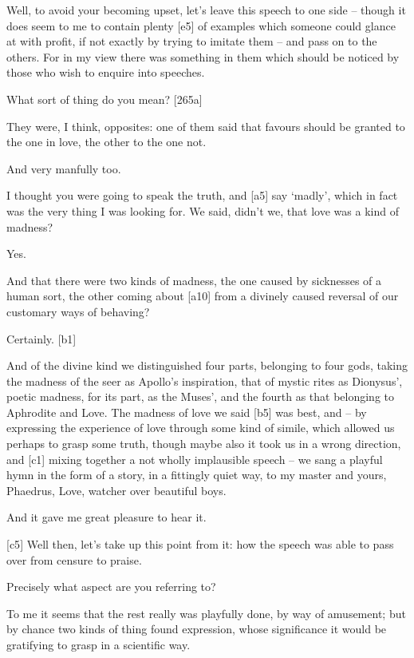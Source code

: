  Well, to avoid your becoming upset, let's leave this speech to
one side -- though it does seem to me to contain plenty {[}e5{]} of
examples which someone could glance at with profit, if not exactly by
trying to imitate them -- and pass on to the others. For in my view
there was something in them which should be noticed by those who wish to
enquire into speeches.

 What sort of thing do you mean? {[}265a{]}

 They were, I think, opposites: one of them said that favours
should be granted to the one in love, the other to the one not.

 And very manfully too.

 I thought you were going to speak the truth, and {[}a5{]} say
‘madly', which in fact was the very thing I was looking for. We said,
didn't we, that love was a kind of madness?

 Yes.

 And that there were two kinds of madness, the one caused by
sicknesses of a human sort, the other coming about {[}a10{]} from a
divinely caused reversal of our customary ways of behaving?

 Certainly. {[}b1{]}

 And of the divine kind we distinguished four parts, belonging
to four gods, taking the madness of the seer as Apollo's inspiration,
that of mystic rites as Dionysus', poetic madness, for its part, as the
Muses', and the fourth as that belonging to Aphrodite and Love. The
madness of love we said {[}b5{]} was best, and -- by expressing the
experience of love through some kind of simile, which allowed us perhaps
to grasp some truth, though maybe also it took us in a wrong direction,
and {[}c1{]} mixing together a not wholly implausible speech -- we sang
a playful hymn in the form of a story, in a fittingly quiet way, to my
master and yours, Phaedrus, Love, watcher over beautiful boys.

 And it gave me great pleasure to hear it.

{[}c5{]}  Well then, let's take up this point from it: how the
speech was able to pass
over from censure to praise.

 Precisely what aspect are you referring to?

 To me it seems that the rest really was playfully done, by way
of amusement; but by chance two kinds of
thing found expression,
whose significance it would be gratifying to grasp in a scientific way.

